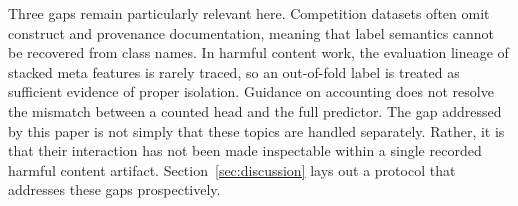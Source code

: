 \documentclass[runningheads]{llncs}
\begin{document}
Three gaps remain particularly relevant here. Competition datasets often omit construct and provenance documentation, meaning that label semantics cannot be recovered from class names. In harmful content work, the evaluation lineage of stacked meta features is rarely traced, so an out-of-fold label is treated as sufficient evidence of proper isolation. Guidance on accounting does not resolve the mismatch between a counted head and the full predictor. The gap addressed by this paper is not simply that these topics are handled separately. Rather, it is that their interaction has not been made inspectable within a single recorded harmful content artifact. Section~\ref{sec:discussion} lays out a protocol that addresses these gaps prospectively.


















\end{document}
